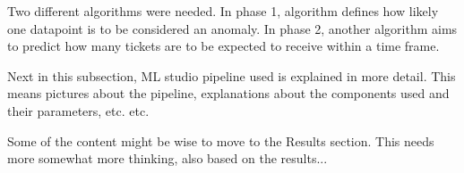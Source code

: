 Two different algorithms were needed.
In phase 1,
algorithm defines how likely one datapoint
is to be considered an anomaly.
In phase 2,
another algorithm aims to predict
how many tickets are to be expected to receive
within a time frame.





\begin{itcomment}
    Next in this subsection, ML studio pipeline used is explained in more detail.
    This means pictures about the pipeline,
    explanations about the components used and their parameters,
    etc. etc.

    Some of the content might be wise to move to the Results section.
    This needs more somewhat more thinking, also based on the results...
\end{itcomment}


